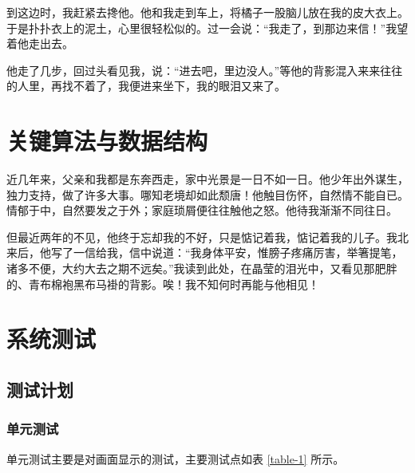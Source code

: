 \documentclass[printMode]{ecnuthesis}
\begin{document}
到这边时，我赶紧去搀他。他和我走到车上，将橘子一股脑儿放在我的皮大衣上。于是扑扑衣上的泥土，心里很轻松似的。过一会说：“我走了，到那边来信！”我望着他走出去。

他走了几步，回过头看见我，说：“进去吧，里边没人。”等他的背影混入来来往往的人里，再找不着了，我便进来坐下，我的眼泪又来了。


\chapter{关键算法与数据结构}

近几年来，父亲和我都是东奔西走，家中光景是一日不如一日。他少年出外谋生，独力支持，做了许多大事。哪知老境却如此颓唐！他触目伤怀，自然情不能自已。情郁于中，自然要发之于外；家庭琐屑便往往触他之怒。他待我渐渐不同往日。

但最近两年的不见，他终于忘却我的不好，只是惦记着我，惦记着我的儿子。我北来后，他写了一信给我，信中说道：“我身体平安，惟膀子疼痛厉害，举箸提笔，诸多不便，大约大去之期不远矣。”我读到此处，在晶莹的泪光中，又看见那肥胖的、青布棉袍黑布马褂的背影。唉！我不知何时再能与他相见！

\chapter{系统测试}

\section{测试计划}

\subsection{单元测试}

单元测试主要是对画面显示的测试，主要测试点如表 \ref{table-1} 所示。
\end{document}
